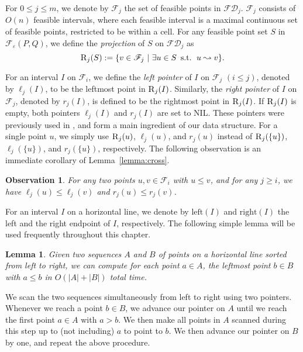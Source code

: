\documentclass[12pt]{dalthesis}
\def\favoritefont{\bfseries \sffamily}
\def\QED{\ensuremath{{\Box}}}
\def\markatright#1{\leavevmode\unskip\nobreak\quad\hspace*{\fill}{#1}}
\newenvironment{proof}
	{\begin{trivlist}\item[\hskip\labelsep{\favoritefont Proof:}]}
	{\markatright{\QED}\end{trivlist}}
\newtheorem{lemma}[theorem]{Lemma}
\newtheorem{obs}{Observation}
\newcommand{\qed}{}
\newcommand{\lee}{\leqslant}
\newcommand{\gee}{\geqslant}
\newcommand{\set}[1]{{\{ #1 \}}}
\newcommand{\eps}{\varepsilon}
\newcommand{\REM}[1]{}
\newcommand{\CF}{{\mathscr F}}
\newcommand{\Feps}{\CF_\eps}
\newcommand{\Left}{\mbox{left}}
\newcommand{\Right}{\mbox{right}}
\newcommand{\FD}{\mathscr {FD}}
\newcommand{\provided}{{\ | \ }}
\newcommand{\F}{\CF}
\newcommand{\RE}{\mbox{\sc R}}
\newcommand{\reach}{\leadsto}
\newcommand{\lp}{\ell}
\newcommand{\rp}{r}
\begin{document}
\REM{
\begin{figure}[t]
	\centering
	\texttt{[image: figs/cross]}
	\caption{Crossing Lemma.}
	\label{fig:cross}
\end{figure}
}

For $0 \lee j \lee m$, we denote by $\F_j$ the set of feasible points in $\FD_j$. 
$\F_j$ consists of $O(n)$ feasible intervals,
where each feasible interval is a maximal continuous set of feasible points,
restricted to be within a cell.
For any feasible point set $S$ in $\Feps(P,Q)$,
we define the \emph{projection} of $S$ on $\FD_j$ as
$$
	\RE_{j}(S) := \set{v \in \F_j \provided \exists u \in S \,\mbox{ s.t. }\,  u \reach v}.
$$

For an interval $I$ on $\F_i$,
we define the \emph{left pointer} of $I$ on $\F_j$ $(i \lee j)$,
denoted by $\lp_{j}(I)$, to be the leftmost point in $\RE_{j}(I)$.
Similarly, the \emph{right pointer} of $I$ on $\F_j$, denoted by $\rp_{j}(I)$,
is defined to be the rightmost point in $\RE_{j}(I)$.
If $\RE_{j}(I)$ is empty, both pointers $\lp_{j}(I)$ and $\rp_{j}(I)$ are set to NIL.
These pointers were previously used in \cite{AltERW03a,AltG95},
and form a main ingredient of our data structure.
For a single point $u$, we simply use $\RE_{j}(u)$, $\lp_{j}(u)$, and $\rp_{j}(u)$
instead of $\RE_{j}(\set{u})$, $\lp_{j}(\set{u})$, and $\rp_{j}(\set{u})$, respectively. 
The following observation is an immediate corollary of Lemma~\ref{lemma:cross}.

\begin{obs} \label{obs:sorted}
	For any two points $u,v \in \F_i$ with $u \lee v$, and for any $j \gee i$,
	we have $\lp_{j}(u) \lee \lp_{j}(v)$ and $\rp_{j}(u) \lee \rp_{j}(v)$.	
\end{obs}


For an interval $I$ on a horizontal line, we denote by $\Left(I)$ and $\Right(I)$ 
the left and the right endpoint of $I$, respectively.
The following simple lemma 
will be used frequently throughout this chapter.


\begin{lemma} \label{lemma:scan}
	Given two sequences $A$ and $B$ of points on a horizontal line sorted from left to right, 
	we can compute for each point $a \in A$,  
	the leftmost point $b \in B$ with $a \lee b$
	in $O(|A|+|B|)$ total time.
\end{lemma}

\begin{proof}
	We scan the two sequences simultaneously from left to right using two pointers.
	Whenever we reach a point $b \in B$,
	we advance our pointer on $A$ until we reach the first point $a \in A$
	with $a > b$. We then make all points in $A$ scanned during this step up to
	(not including) $a$ to point to $b$.
	We then advance our pointer on $B$ by one, and repeat the above procedure.
	\qed
\end{proof}
\end{document}
